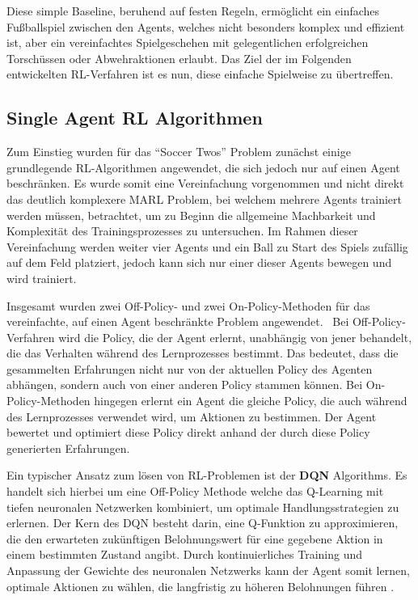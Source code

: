 \documentclass[twocolumn]{webofc}
\begin{document}
Diese simple Baseline, beruhend auf festen Regeln, ermöglicht ein einfaches Fußballspiel zwischen den Agents, welches nicht besonders komplex und effizient ist, aber ein vereinfachtes Spielgeschehen mit gelegentlichen erfolgreichen Torschüssen oder Abwehraktionen erlaubt. Das Ziel der im Folgenden entwickelten \ac{RL}-Verfahren ist es nun, diese einfache Spielweise zu übertreffen.


\subsection{Single Agent RL Algorithmen}

Zum Einstieg wurden für das \enquote{Soccer Twos} Problem zunächst einige grundlegende \ac{RL}-Algorithmen angewendet, die sich jedoch nur auf einen Agent beschränken. Es wurde somit eine Vereinfachung vorgenommen und nicht direkt das deutlich komplexere \ac{MARL} Problem, bei welchem mehrere Agents trainiert werden müssen, betrachtet, um zu Beginn die allgemeine Machbarkeit und Komplexität des Trainingsprozesses zu untersuchen. Im Rahmen dieser Vereinfachung werden weiter vier Agents und ein Ball zu Start des Spiels zufällig auf dem Feld platziert, jedoch kann sich nur einer dieser Agents bewegen und wird trainiert. 

Insgesamt wurden zwei Off-Policy- und zwei On-Policy-Methoden für das vereinfachte, auf einen Agent beschränkte Problem angewendet. 
Bei Off-Policy-Verfahren wird die Policy, die der Agent erlernt, unabhängig von jener behandelt, die das Verhalten während des Lernprozesses bestimmt. Das bedeutet, dass die gesammelten Erfahrungen nicht nur von der aktuellen Policy des Agenten abhängen, sondern auch von einer anderen Policy stammen können.
Bei On-Policy-Methoden hingegen erlernt ein Agent die gleiche Policy, die auch während des Lernprozesses verwendet wird, um Aktionen zu bestimmen. Der Agent bewertet und optimiert diese Policy direkt anhand der durch diese Policy generierten Erfahrungen.

Ein typischer Ansatz zum lösen von \ac{RL}-Problemen ist der \textbf{\ac{DQN}} Algorithms. Es handelt sich hierbei um eine Off-Policy Methode welche das Q-Learning mit tiefen neuronalen Netzwerken kombiniert, um optimale Handlungsstrategien zu erlernen. Der Kern des \ac{DQN} besteht darin, eine Q-Funktion zu approximieren, die den erwarteten zukünftigen Belohnungswert für eine gegebene Aktion in einem bestimmten Zustand angibt. %
Durch kontinuierliches Training und Anpassung der Gewichte des neuronalen Netzwerks kann der Agent somit lernen, optimale Aktionen zu wählen, die langfristig zu höheren Belohnungen führen \cite{mnih2013}. 
\end{document}
